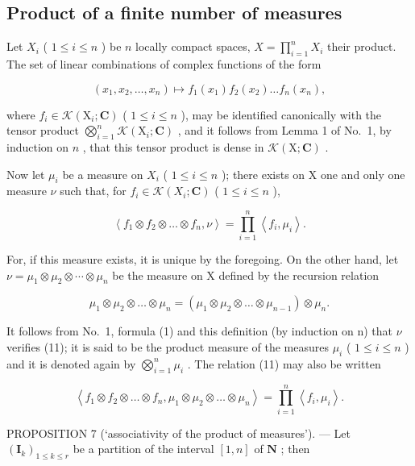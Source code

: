 \subsection{Product of a finite number of measures}

Let \(X_{i}\) ( \(1 \leqslant i \leqslant n\) ) be \(n\) locally compact spaces, \(X = \prod_{i=1}^{n} X_{i}\) their product. The set of linear combinations of complex functions of the form

\[
\left(x _ {1}, x _ {2}, \dots , x _ {n}\right) \mapsto f _ {1} \left(x _ {1}\right) f _ {2} \left(x _ {2}\right) \dots f _ {n} \left(x _ {n}\right),
\]

where \(f_{i} \in \mathcal{K}(\mathrm{X}_{i};\mathbf{C})\) ( \(1 \leqslant i \leqslant n\) ), may be identified canonically with the tensor product \(\bigotimes_{i=1}^{n} \mathcal{K}(\mathrm{X}_{i};\mathbf{C})\) , and it follows from Lemma 1 of No.~1, by induction on \(n\) , that this tensor product is dense in \(\mathcal{K}(\mathrm{X};\mathbf{C})\) .

Now let \(\mu_{i}\) be a measure on \(X_{i}\) ( \(1 \leqslant i \leqslant n\) ); there exists on X one and only one measure \(\nu\) such that, for \(f_{i} \in \mathcal{K}(X_{i}; \mathbf{C})\) ( \(1 \leqslant i \leqslant n\) ),

\[
\left\langle f _ {1} \otimes f _ {2} \otimes \dots \otimes f _ {n}, \nu \right\rangle = \prod_ {i = 1} ^ {n} \left\langle f _ {i}, \mu_ {i} \right\rangle .\tag{11}
\]

For, if this measure exists, it is unique by the foregoing. On the other hand, let \(\nu = \mu_{1} \otimes \mu_{2} \otimes \cdots \otimes \mu_{n}\) be the measure on X defined by the recursion relation

\[
\mu_ {1} \otimes \mu_ {2} \otimes \dots \otimes \mu_ {n} = (\mu_ {1} \otimes \mu_ {2} \otimes \dots \otimes \mu_ {n - 1}) \otimes \mu_ {n}.
\]

It follows from No.~1, formula (1) and this definition (by induction on n) that \(\nu\) verifies (11); it is said to be the product measure of the measures \(\mu_{i}\) ( \(1 \leqslant i \leqslant n\) ) and it is denoted again by \(\bigotimes_{i=1}^{n} \mu_{i}\) . The relation (11) may also be written

\[
\left\langle f _ {1} \otimes f _ {2} \otimes \dots \otimes f _ {n}, \mu_ {1} \otimes \mu_ {2} \otimes \dots \otimes \mu_ {n} \right\rangle = \prod_ {i = 1} ^ {n} \left\langle f _ {i}, \mu_ {i} \right\rangle .\tag{12}
\]

PROPOSITION 7 (`associativity of the product of measures'). --- Let \((\mathbf{I}_k)_{1 \leqslant k \leqslant r}\) be a partition of the interval \([1, n]\) of \(\mathbf{N}\) ; then

